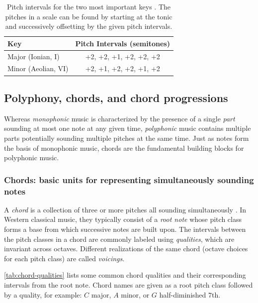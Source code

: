 \begin{table}[tb]
    \centering
    \caption{Pitch intervals for the two most important keys \citep{freedman2015correlational}. The pitches in a scale can be found by starting at the tonic and successively offsetting by the given pitch intervals.}
    \label{tab:key-intervals}
    \begin{tabular}{lc}
        \toprule
        Key & Pitch Intervals (semitones) \\
        \midrule
        Major (Ionian, I) & +2, +2, +1, +2, +2, +2 \\
        Minor (Aeolian, VI) & +2, +1, +2, +2, +1, +2 \\
        \bottomrule
    \end{tabular}
\end{table}

\subsection{Polyphony, chords, and chord progressions}

Whereas \emph{monophonic} music is characterized by the presence of a single
\emph{part} sounding at most one note at any given time, \emph{polyphonic}
music contains multiple parts potentially sounding multiple pitches at the same
time. Just as notes form the basis of monophonic music, chords are the fundamental
building blocks for polyphonic music.

\subsubsection{Chords: basic units for representing simultaneously sounding notes}

A \emph{chord} is a collection of three or more pitches all sounding
simultaneously \citep{randel1999harvard}. In Western classical music, they
typically consist of a \emph{root note} whose pitch class forms a base from
which successive notes are built upon. The intervals between the pitch classes
in a chord are commonly labeled using \emph{qualities}, which are invariant
across octaves. Different realizations of the same chord (\eg octave choices
for each pitch class) are called \emph{voicings}.

\cref{tab:chord-qualities} lists some common chord qualities and their
corresponding intervals from the root note. Chord names are given as a root
pitch class followed by a quality, for example: $C$ major, $A$ minor, or $G$
half-diminished $7$th.

